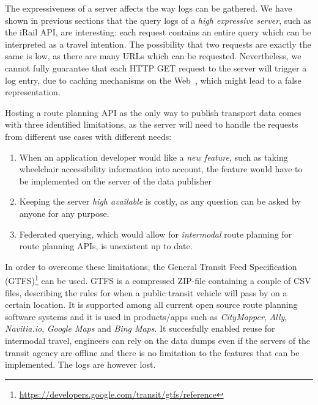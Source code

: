 \documentclass{sig-alternate}
\begin{document}
The expressiveness of a server affects the way logs can be gathered.
We have shown in previous sections that the query logs of a \emph{high expressive server}, such as the iRail API, are interesting: each request contains an entire query which can be interpreted as a travel intention.
The possibility that two requests are exactly the same is low, as there are many URLs which can be requested.
Nevertheless, we cannot fully guarantee that each HTTP GET request to the server will trigger a log entry, due to caching mechanisms on the Web~\cite{fielding}, which might lead to a false representation.

Hosting a route planning API as the only way to publish transport data comes with three identified limitations, as the server will need to handle the requests from different use cases with different needs:
\begin{enumerate}
  \item When an application developer would like a \emph{new feature}, such as taking wheelchair accessibility information into account, the feature would have to be implemented on the server of the data publisher
  \item Keeping the server \emph{high available} is costly, as any question can be asked by anyone for any purpose.
  \item Federated querying, which would allow for \emph{intermodal} route planning for route planning APIs, is unexistent up to date.
\end{enumerate}

In order to overcome these limitations, the General Transit Feed Specification (GTFS)\footnote{\url{https://developers.google.com/transit/gtfs/reference}} can be used. 
GTFS is a compressed ZIP-file containing a couple of CSV files, describing the rules for when a public transit vehicle will pass by on a certain location.
It is supported among all current open source route planning software systems and it is used in products/apps such as \emph{CityMapper}, \emph{Ally}, \emph{Navitia.io}, \emph{Google Maps} and \emph{Bing Maps}.
It succesfully enabled reuse for intermodal travel, engineers can rely on the data dumps even if the servers of the transit agency are offline and there is no limitation to the features that can be implemented.
The logs are however lost.
\end{document}
